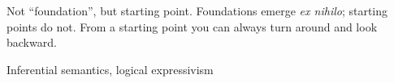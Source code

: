 

Not ``foundation'', but starting point. Foundations emerge \textit{ex
  nihilo}; starting points do not. From a starting point you can
always turn around and look backward.

Inferential semantics, logical expressivism



